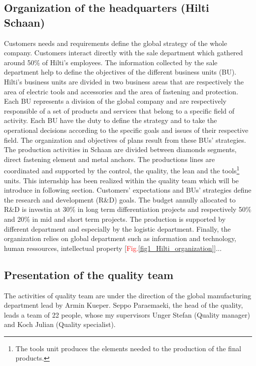 \documentclass[12pt, french, a4paper]{article} %
\begin{document}
\subsection{Organization of the headquarters (Hilti Schaan)} 
Customers needs and requirements define the global strategy of the whole company. Customers interact directly with the sale department which gathered around 50\% of Hilti's employees. The information collected by the sale department help to define the objectives of the different business units (\gls{BU}). Hilti's business units are divided in two business areas that are respectively the area of electric tools and accessories and the area of fastening and protection. Each \gls{BU} represents a division of the global company and are respectively responsible of a set of products and services that belong to a specific field of activity. Each \gls{BU} have the duty to define the strategy and to take the operational decisions according to the specific goals and issues of their respective field. The organization and objectives of plans result from these \gls{BU}s' strategies. The production activities in Schaan are divided between diamonds segments, direct fastening element and metal anchors. The productions lines are coordinated and supported by the control, the quality, the lean and the tools\footnote{The tools unit produces the elements needed to the production of the final products.} units. This internship has been realized within the quality team which will be introduce in following section. Customers' expectations and \gls{BU}s' strategies define the research and development (R\&D) goals. The budget annully allocated to R\&D is investin at 30\% in long term differentiation projects and respectively 50\% and 20\% in mid and short term projects. The production is supported by different department and especially by the logistic department. Finally, the organization relies on global department such as information and technology, human ressources, intellectual property [\textcolor{red}{Fig.}\ref{fig1_Hilti_organization}]... 


\subsection{Presentation of the quality team}
The activities of quality team are under the direction of the global manufacturing department lead by Armin Kueper. Seppo Paraemaeki, the head of the quality, leads a team of 22 people, whose my supervisors Unger Stefan (Quality manager) and Koch Julian (Quality specialist). 
\end{document}
